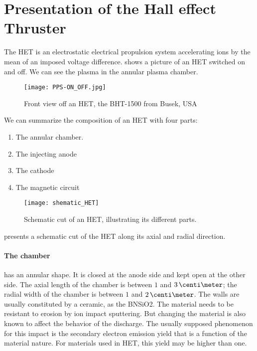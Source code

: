 

\section*{Presentation of the Hall effect Thruster }
  \label{sec-HET}

  
  The \ac{HET} is an electrostatic electrical propulsion system accelerating ions by the mean of an imposed voltage difference.
   shows a picture of an \ac{HET} switched on and off.
  We can see the plasma in the annular plasma chamber.


  \begin{figure}[hbt]
    \centering
    \texttt{[image: PPS-ON\_OFF.jpg]}
    \caption{Front view off an \acs{HET}, the BHT-1500 from Busek, USA}
    \label{fig-bhtonoff}
  \end{figure}

  We can summarize the composition of an \ac{HET} with four parts\string:
  \begin{enumerate}
    \item The annular chamber.
    \item The injecting anode
    \item The cathode
    \item The magnetic circuit
  \end{enumerate}

  \begin{figure}[hbt]
    \centering
    \texttt{[image: shematic\_HET]}
    \caption{Schematic cut of an \acs{HET}, illustrating its different parts. }
    \label{fig-shematiccut}
  \end{figure}

   presents a schematic cut of the \ac{HET} along its axial and radial direction.

  \paragraph{The chamber} has an annular shape.
  It is closed at the anode side and kept open at the other side.
  The axial length of the chamber is between $1$ and $3\,\centi\meter$; the radial width of the chamber is between $1$ and $2\,\centi\meter$. 
  The walls are usually constituted by a ceramic, as the \ac{BNSiO2}.
  The material needs to be resistant to erosion by ion impact sputtering.
  But changing the material is also known to affect the behavior of the discharge.
  The usually supposed phenomenon for this impact is the secondary electron emission yield that is a function of the material nature.
  For materials used in HET, this yield may be higher than one.


